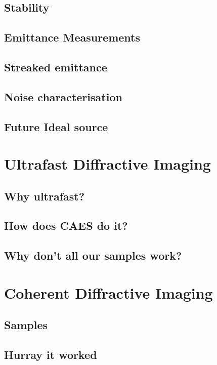 \section{Stability}

\section{Emittance Measurements}

\section{Streaked emittance}

\section{Noise characterisation}

\section{Future Ideal source}


\chapter{Ultrafast Diffractive Imaging}

\section{Why ultrafast?}

\section{How does CAES do it?}

\section{Why don't all our samples work?}


\chapter{Coherent Diffractive Imaging}

\section{Samples}

\section{Hurray it worked}


